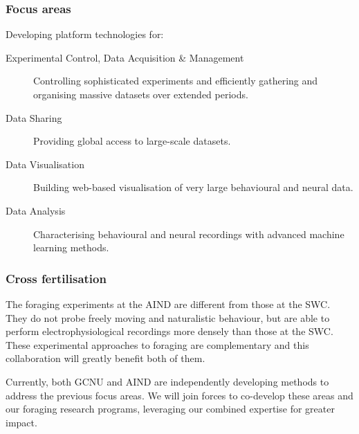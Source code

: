 \subsubsection{Focus areas}

Developing platform technologies for:

\begin{description}

    \item[Experimental Control, Data Acquisition \& Management] Controlling
        sophisticated experiments and efficiently gathering and organising
        massive datasets over extended periods.

    \item[Data Sharing] Providing global access to large-scale datasets.

    \item[Data Visualisation] Building web-based visualisation of very large
        behavioural and neural data.

    \item[Data Analysis] Characterising behavioural and neural recordings with
        advanced machine learning methods.

\end{description}

\subsubsection{Cross fertilisation}

The foraging experiments at the AIND are different from those at the SWC. They
do not probe freely moving and naturalistic behaviour, but are able to perform
electrophysiological recordings more densely than those at the SWC.
%
These experimental approaches to foraging are complementary and this
collaboration will greatly benefit both of them.

Currently, both GCNU and AIND are independently developing methods to address
the previous focus areas. We will join forces to co-develop these areas and
our foraging research programs, leveraging our combined expertise for greater
impact.
